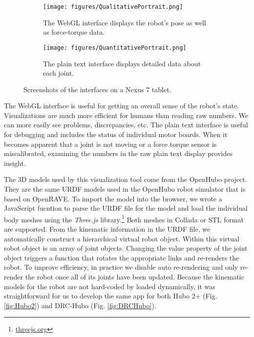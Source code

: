 \documentclass[letterpaper, 10 pt, conference]{ieee/ieeeconf}  %
\begin{document}
\begin{figure*}[ptb]
    \centering
    \begin{subfigure}[b]{2.5in}
        \centering
        \texttt{[image: figures/QualitativePortrait.png]}
        \caption{The WebGL interface displays the robot's pose as well as force-torque data.}
        \label{fig:Qualitative}
    \end{subfigure}%
    \quad
    \begin{subfigure}[b]{2.5in}
        \centering
        \texttt{[image: figures/QuantitativePortrait.png]}
        \caption{The plain text interface displays detailed data about each joint. }
        \label{fig:Quantitative}
    \end{subfigure}%
    \caption{Screenshots of the interfaces on a Nexus 7 tablet.}
    \label{fig:Screenshots}
\end{figure*}

The WebGL interface is useful for getting an overall sense of the robot's state.
Visualizations are much more efficient for humans than reading raw numbers.
We can more easily see problems, discrepancies, etc.
The plain text interface is useful for debugging and includes the status of individual motor boards.
When it becomes apparent that a joint is not moving or a force torque sensor is miscalibrated, examining the numbers in the raw plain text display provides insight.

The 3D models used by this visualization tool come from the OpenHubo project.\cite{lofaro2012humanoid}
They are the same URDF models used in the OpenHubo robot simulator that is based on OpenRAVE.
To import the model into the browser, we wrote a JavaScript fucntion to parse the URDF file for the model and load the individual body meshes using the \textit{Three.js} library.\footnote{\url{threejs.org}}
Both meshes in Collada or STL format are supported.
From the kinematic information in the URDF file, we automatically construct a hierarchical virtual robot object.
Within this virtual robot object is an array of joint objects.
Changing the value property of the joint object triggers a function that rotates the appropriate links and re-renders the robot.
To improve efficiency, in practice we disable auto re-rendering and only re-render the robot once all of its joints have been updated.
Because the kinematic models for the robot are not hard-coded by loaded dynamically, it was straightforward for us to develop the same app for both Hubo 2+ (Fig. \ref{fig:Hubo2}) and DRC-Hubo (Fig. \ref{fig:DRCHubo}).
\end{document}
